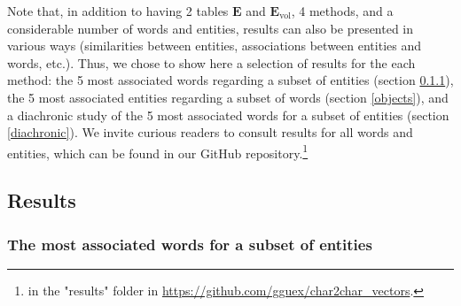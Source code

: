 \documentclass[
twocolumn,
]{ceurart}
\begin{document}
Note that, in addition to having 2 tables $\mathbf{E}$ and $\mathbf{E}_\text{vol}$, 4 methods, and a considerable number of words and entities, results can also be presented in various ways (similarities between entities, associations between entities and words, etc.). Thus, we chose to show here a selection of results for the each method: the 5 most associated words regarding a subset of entities (section \ref{words}), the 5 most associated entities regarding a subset of words (section \ref{objects}), and a diachronic study of the 5 most associated words for a subset of entities (section \ref{diachronic}). We invite curious readers to consult results for all words and entities, which can be found in our GitHub repository.\footnote{in the "results" folder in \url{https://github.com/gguex/char2char_vectors}.}

\subsection{Results}

\subsubsection{The most associated words for a subset of entities}
\label{words}

\end{document}
